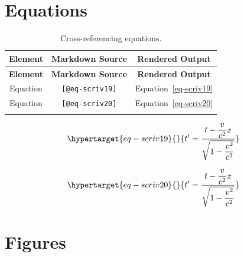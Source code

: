 \documentclass[
  12pt,
  a4paper,
  oneside,
  numbers=noenddot,
  titlepage,
  toclink=all,
  toc=bibliography]{scrbook}
\theoremstyle{definition}
\theoremstyle{definition}
\theoremstyle{definition}
\theoremstyle{plain}
\theoremstyle{plain}
\theoremstyle{plain}
\theoremstyle{plain}
\theoremstyle{plain}
\theoremstyle{remark}
\begin{document}
\newpage{}

\hypertarget{sec-scriv18}{%
\section{Equations}\label{sec-scriv18}}

\hypertarget{tbl-scriv18}{}
\begin{longtable}[]{@{}ccc@{}}
\toprule\noalign{}
\textbf{Element} & \textbf{Markdown Source} & \textbf{Rendered
Output} \\
\midrule\noalign{}
\endfirsthead
\toprule\noalign{}
\textbf{Element} & \textbf{Markdown Source} & \textbf{Rendered
Output} \\
\midrule\noalign{}
\endhead
\bottomrule\noalign{}
\endlastfoot
Equation & \texttt{{[}@eq-scriv19{]}} &
\protect\hypertarget{cite_71}{}{\label{cite_71}Equation~\ref{eq-scriv19}} \\
Equation & \texttt{{[}@eq-scriv20{]}} &
\protect\hypertarget{cite_72}{}{\label{cite_72}Equation~\ref{eq-scriv20}} \\
\caption{\label{tbl-scriv18}Cross-referencing equations.}\tabularnewline
\end{longtable}

\begin{equation}\protect\hypertarget{eq-scriv19}{}{t' = \frac{t - \dfrac{v}{c^{2}}x}{\sqrt{1 - \dfrac{v^{2}}{c^{2}}}}}\label{eq-scriv19}\end{equation}

\begin{equation}\protect\hypertarget{eq-scriv20}{}{t' = \frac{t - \dfrac{v}{c^{2}}x}{\sqrt{1 - \dfrac{v^{2}}{c^{2}}}}
}\label{eq-scriv20}\end{equation}

\newpage{}

\hypertarget{sec-scriv21}{%
\section{Figures}\label{sec-scriv21}}

\end{document}
